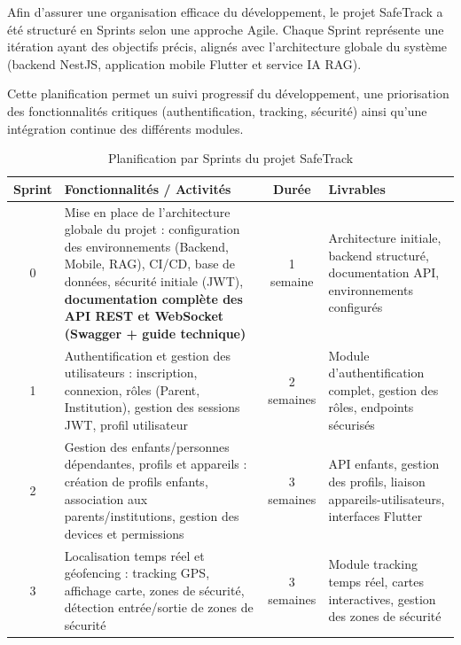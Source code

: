 Afin d'assurer une organisation efficace du développement, le projet SafeTrack a été structuré en Sprints selon une approche Agile. Chaque Sprint représente une itération ayant des objectifs précis, alignés avec l'architecture globale du système (backend NestJS, application mobile Flutter et service IA RAG).

Cette planification permet un suivi progressif du développement, une priorisation des fonctionnalités critiques (authentification, tracking, sécurité) ainsi qu'une intégration continue des différents modules.

\renewcommand{\arraystretch}{1.3}
\small
\begin{longtable}{|c|p{6.8cm}|c|p{5cm}|}
    \caption{Planification par Sprints du projet SafeTrack}\label{tab:plan_sprints}\\
    \hline
    \rowcolor{gray!20}
    	{Sprint} & \textbf{Fonctionnalités / Activités} & \textbf{Durée} & \textbf{Livrables} \\
    \hline
    \endfirsthead

    \hline
    \endfoot

    \hline
    \endlastfoot

    0 &
    Mise en place de l'architecture globale du projet :
    configuration des environnements (Backend, Mobile, RAG),
    CI/CD, base de données, sécurité initiale (JWT),
    	\textbf{documentation complète des API REST et WebSocket (Swagger + guide technique)} &
    1 semaine &
    Architecture initiale, backend structuré, documentation API, environnements configurés \\
    \hline

    1 &
    Authentification et gestion des utilisateurs :
    inscription, connexion, rôles (Parent, Institution),
    gestion des sessions JWT, profil utilisateur &
    2 semaines &
    Module d'authentification complet, gestion des rôles, endpoints sécurisés \\
    \hline

    2 &
    Gestion des enfants/personnes dépendantes, profils et appareils :
    création de profils enfants, association aux parents/institutions,
    gestion des devices et permissions &
    3 semaines &
    API enfants, gestion des profils, liaison appareils-utilisateurs, interfaces Flutter \\
    \hline

    3 &
    Localisation temps réel et géofencing :
    tracking GPS, affichage carte, zones de sécurité,
    détection entrée/sortie de zones de sécurité &
    3 semaines &
    Module tracking temps réel, cartes interactives, gestion des zones de sécurité \\
    \hline


\end{longtable}
